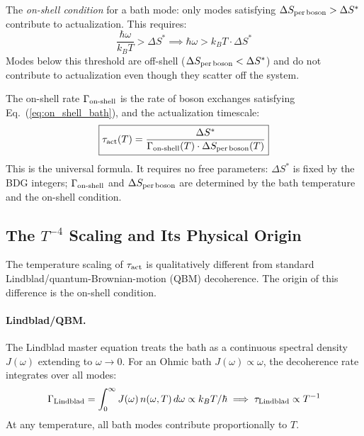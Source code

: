 \documentclass[12pt,a4paper]{article}
\begin{document}
The \emph{on-shell condition} for a bath mode: only modes satisfying $\Delta S_{\rm per\,boson}>\Delta S^*$ contribute to actualization.  This requires:
\begin{equation}
  \frac{\hbar\omega}{k_BT} > \Delta S^* \implies \hbar\omega > k_BT\cdot\Delta S^*
  \label{eq:on_shell_bath}
\end{equation}
Modes below this threshold are off-shell ($\Delta S_{\rm per\,boson}<\Delta S^*$) and do not contribute to actualization even though they scatter off the system.

The on-shell rate $\Gamma_{\rm on\text{-}shell}$ is the rate of boson exchanges satisfying Eq.~(\ref{eq:on_shell_bath}), and the actualization timescale:
\begin{equation}
  \boxed{\tau_{\rm act}(T) = \frac{\Delta S^*}{\Gamma_{\rm on\text{-}shell}(T)\cdot\Delta S_{\rm per\,boson}(T)}}
  \label{eq:tau_master}
\end{equation}
This is the universal formula.  It requires no free parameters: $\Delta S^*$ is fixed by the BDG integers; $\Gamma_{\rm on\text{-}shell}$ and $\Delta S_{\rm per\,boson}$ are determined by the bath temperature and the on-shell condition.

\subsection{The $T^{-4}$ Scaling and Its Physical Origin}

The temperature scaling of $\tau_{\rm act}$ is qualitatively different from standard Lindblad/quantum-Brownian-motion (QBM) decoherence.  The origin of this difference is the on-shell condition.

\paragraph{Lindblad/QBM.}  The Lindblad master equation treats the bath as a continuous spectral density $J(\omega)$ extending to $\omega\to0$.  For an Ohmic bath $J(\omega)\propto\omega$, the decoherence rate integrates over all modes:
\begin{equation}
  \Gamma_{\rm Lindblad} = \int_0^\infty J(\omega)\,n(\omega,T)\,d\omega \propto k_BT/\hbar \implies \tau_{\rm Lindblad}\propto T^{-1}
  \label{eq:lindblad_scaling}
\end{equation}
At any temperature, all bath modes contribute proportionally to $T$.
\end{document}

